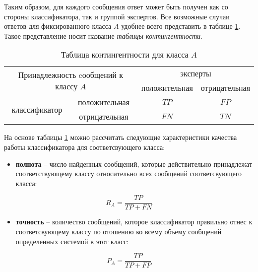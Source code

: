     Таким образом, для каждого сообщения ответ может быть получен как со стороны
    классификатора, так и группой экспертов. Все возможные случаи ответов
    для фиксированного класса $A$ удобнее всего представить в таблице
    \ref{table:contingent}. Такое представление носит название
    {\it таблицы контингентности}.

    \begin{table}[H]
        \centering
        \caption{Таблица контингентности для класса $A$}
        \label{table:contingent}
        \begin{tabular}{|c|c|c|c|}
            \hline
            \multicolumn{2}{|c|}{\multirow{2}{*}{Принадлежность cообщений к классу $A$}} &     \multicolumn{2}{c|}{эксперты}                     \\ \cline{3-4}
            \multicolumn{2}{|c|}{}                                              &   положительная             & отрицательная                           \\ \hline
            \multirow{2}{*}{классификатор}          & положительная             & {\cellcolor[HTML]{9AFF99} $TP$} & {\cellcolor[HTML]{FFCCC9} $FP$}     \\ \cline{2-4}
                                                    & отрицательная             & {\cellcolor[HTML]{FFCCC9} $FN$} & {\cellcolor[HTML]{9AFF99} $TN$}     \\ \hline
        \end{tabular}
     \end{table}

     На основе таблицы \ref{table:contingent} можно рассчитать следующие
     характеристики качества работы классификатора для соответсвующего класса:
    \begin{itemize}
        \item {\bf полнота} -- число найденных сообщений, которые
            действительно принадлежат соответствующему классу относительно всех
            сообщений соответсвующего класса:

            \begin{equation}
                \label{eq:recall}
                R_A = \dfrac{TP}{TP + FN} \hspace{20pt}
            \end{equation}

        \item {\bf точность} -- количество сообщений, которое
            классификатор правильно отнес к соответсвующему классу по отошению
            ко всему объему сообщений определенных системой в этот класс:

            \begin{equation}
                \label{eq:precision}
                P_A = \dfrac{TP}{TP + FP} \hspace{20pt}
            \end{equation}
    \end{itemize}

